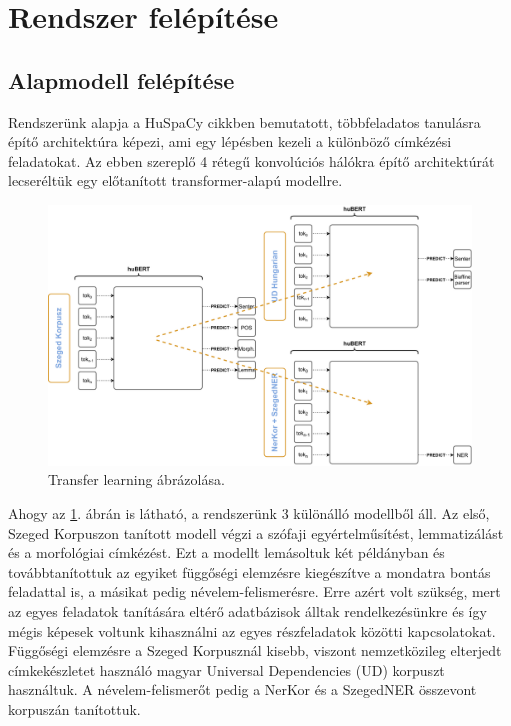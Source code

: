 \documentclass{llncs}
\newcommand{\huspacy}{HuSpaCy}
\newcommand{\trf}{transformer}
\begin{document}
\section{Rendszer felépítése}

\subsection{Alapmodell felépítése}
\label{transfer_learn}

Rendszerünk alapja a \huspacy{} \citep{huspacy} cikkben bemutatott, többfeladatos tanulásra építő architektúra képezi, ami egy lépésben kezeli a különböző címkézési feladatokat. Az ebben szereplő 4 rétegű konvolúciós hálókra építő architektúrát lecseréltük egy előtanított \trf{}-alapú modellre. 


\begin{figure}[h]
    \center
    \includegraphics[scale=.40]{Transfer_learning.drawio.pdf}
    \caption{Transfer learning ábrázolása.}
    \label{transfer_learning}
\end{figure}

Ahogy az \ref{transfer_learning}. ábrán is látható, a rendszerünk 3 különálló modellből áll. Az első, Szeged Korpuszon \citep{szc} tanított modell végzi a szófaji egyértelműsítést, lemmatizálást és a morfológiai címkézést. Ezt a modellt lemásoltuk két példányban és továbbtanítottuk az egyiket függőségi elemzésre kiegészítve a mondatra bontás feladattal is, a másikat pedig névelem-felismerésre. Erre azért volt szükség, mert az egyes feladatok tanítására eltérő adatbázisok álltak rendelkezésünkre és így mégis képesek voltunk kihasználni az egyes részfeladatok közötti kapcsolatokat. Függőségi elemzésre a Szeged Korpusznál kisebb, viszont nemzetközileg elterjedt címkekészletet használó magyar Universal Dependencies \citep{nivre2017universal} (UD) korpuszt használtuk. A névelem-felismerőt pedig a NerKor \citep{nerkor} és a SzegedNER \citep{szegedner} összevont korpuszán tanítottuk.
\end{document}
